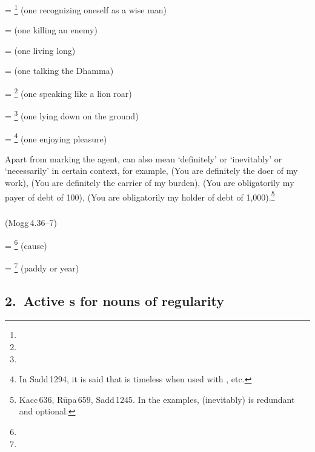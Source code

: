  = \footnote{} (one recognizing oneself as a wise man)\par
{} =  (one killing an enemy)\par
{} =  (one living long)\par
{} =  (one talking the Dhamma)\par
{} = \footnote{} (one speaking like a lion roar)\par
{} = \footnote{} (one lying down on the ground)\par
{} = \footnote{ In Sadd\,1294, it is said that  is timeless when used with , etc.} (one enjoying pleasure)\par

Apart from marking the agent,  can also mean `definitely' or `inevitably' or `necessarily' in certain context, for example,  (You are definitely the doer of my work),  (You are definitely the carrier of my burden),  (You are obligatorily my payer of debt of 100),  (You are obligatorily my holder of debt of 1,000).\footnote{Kacc\,636, R\=upa\,659, Sadd\,1245. In the examples,  (inevitably) is redundant and optional.}

\subparagraph*{} (Mogg\,4.36--7)\label{pacck1:dnana}

 = \footnote{} (cause)\par
{} = \footnote{} (paddy or year)\par

\subsection*{2.\ Active s for nouns of regularity}\label{kita:group2}

